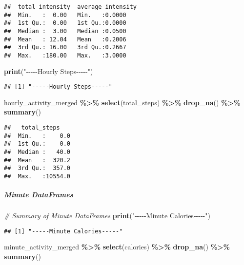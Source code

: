 \documentclass[
]{article}
\newenvironment{Shaded}{\begin{snugshade}}{\end{snugshade}}
\newcommand{\CommentTok}[1]{\textcolor[rgb]{0.56,0.35,0.01}{\textit{#1}}}
\newcommand{\FunctionTok}[1]{\textcolor[rgb]{0.13,0.29,0.53}{\textbf{#1}}}
\newcommand{\NormalTok}[1]{#1}
\newcommand{\SpecialCharTok}[1]{\textcolor[rgb]{0.81,0.36,0.00}{\textbf{#1}}}
\newcommand{\StringTok}[1]{\textcolor[rgb]{0.31,0.60,0.02}{#1}}
\begin{document}
\begin{verbatim}
##  total_intensity  average_intensity
##  Min.   :  0.00   Min.   :0.0000   
##  1st Qu.:  0.00   1st Qu.:0.0000   
##  Median :  3.00   Median :0.0500   
##  Mean   : 12.04   Mean   :0.2006   
##  3rd Qu.: 16.00   3rd Qu.:0.2667   
##  Max.   :180.00   Max.   :3.0000
\end{verbatim}

\begin{Shaded}
\begin{Highlighting}[]
\FunctionTok{print}\NormalTok{(}\StringTok{"{-}{-}{-}{-}{-}Hourly Steps{-}{-}{-}{-}{-}"}\NormalTok{)}
\end{Highlighting}
\end{Shaded}

\begin{verbatim}
## [1] "-----Hourly Steps-----"
\end{verbatim}

\begin{Shaded}
\begin{Highlighting}[]
\NormalTok{hourly\_activity\_merged }\SpecialCharTok{\%\textgreater{}\%} 
 \FunctionTok{select}\NormalTok{(total\_steps) }\SpecialCharTok{\%\textgreater{}\%} 
 \FunctionTok{drop\_na}\NormalTok{() }\SpecialCharTok{\%\textgreater{}\%} 
 \FunctionTok{summary}\NormalTok{()}
\end{Highlighting}
\end{Shaded}

\begin{verbatim}
##   total_steps     
##  Min.   :    0.0  
##  1st Qu.:    0.0  
##  Median :   40.0  
##  Mean   :  320.2  
##  3rd Qu.:  357.0  
##  Max.   :10554.0
\end{verbatim}

\hypertarget{minute-dataframes-9}{%
\subparagraph{Minute DataFrames}\label{minute-dataframes-9}}

\begin{Shaded}
\begin{Highlighting}[]
\CommentTok{\# Summary of Minute DataFrames}
\FunctionTok{print}\NormalTok{(}\StringTok{"{-}{-}{-}{-}{-}Minute Calories{-}{-}{-}{-}{-}"}\NormalTok{)}
\end{Highlighting}
\end{Shaded}

\begin{verbatim}
## [1] "-----Minute Calories-----"
\end{verbatim}

\begin{Shaded}
\begin{Highlighting}[]
\NormalTok{minute\_activity\_merged }\SpecialCharTok{\%\textgreater{}\%} 
 \FunctionTok{select}\NormalTok{(calories) }\SpecialCharTok{\%\textgreater{}\%} 
 \FunctionTok{drop\_na}\NormalTok{() }\SpecialCharTok{\%\textgreater{}\%} 
 \FunctionTok{summary}\NormalTok{()}
\end{Highlighting}
\end{Shaded}
\end{document}
